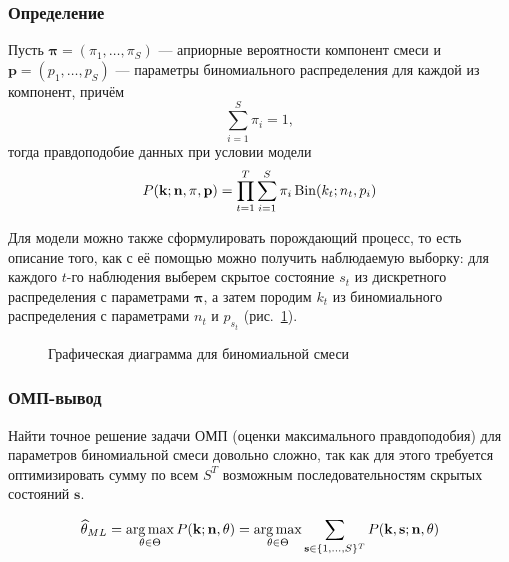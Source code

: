 \subsubsection{Определение}
Пусть $\mathbf{\pi} = (\pi_1, \ldots, \pi_S)$ --- априорные вероятности компонент смеси
и $\mathbf{p} = (p_1, \ldots, p_S)$ --- параметры биномиального распределения для каждой
из компонент, причём
$$
\sum\limits_{i = 1}^S \pi_i = 1,
$$
тогда правдоподобие данных при условии модели
$$
P(\mathbf{k}; \mathbf{n}, \mathbf{\pi}, \mathbf{p})
= \prod\limits_{t = 1}^T \sum\limits_{i = 1}^S
  \pi_i \operatorname{Bin}(k_t; n_t, p_i)
$$

Для модели можно также сформулировать порождающий процесс, то есть описание того,
как с её помощью можно получить наблюдаемую выборку: для каждого $t$-го наблюдения
выберем скрытое состояние $s_t$ из дискретного распределения с параметрами $\mathbf{\pi}$,
а затем породим $k_t$ из биномиального распределения с параметрами $n_t$ и $p_{s_t}$
(рис.~\ref{fig:generative-mm}).

\begin{figure}[h!]
  \centering
  \caption{Графическая диаграмма для биномиальной смеси}
  \label{fig:generative-mm}
\end{figure}

\subsubsection{ОМП-вывод}

Найти точное решение задачи ОМП (оценки максимального правдоподобия) для параметров биномиальной
смеси довольно сложно, так как для этого требуется оптимизировать сумму по всем $S^T$ возможным
последовательностям скрытых состояний $\mathbf{s}$.

\begin{align*}
  \widehat{\theta}_{ML}
  = \operatorname*{arg\,max}_{\mathbf{\theta} \in \Theta}
    P(\mathbf{k}; \mathbf{n}, \mathbf{\theta})
  = \operatorname*{arg\,max}_{\mathbf{\theta} \in \Theta}
    \sum\limits_{\mathbf{s} \in \{1, \ldots, S\}^T}
    P(\mathbf{k}, \mathbf{s}; \mathbf{n}, \mathbf{\theta})
\end{align*}

